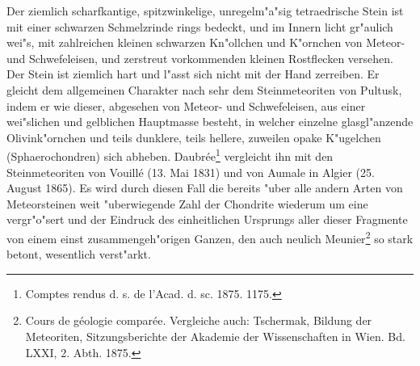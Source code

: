 \documentclass[a4paper, 11pt, oneside]{article}
\begin{document}
Der ziemlich scharfkantige, spitzwinkelige, unregelm"a"sig tetraedrische Stein ist mit einer schwarzen Schmelzrinde rings bedeckt, und im Innern licht gr"aulich wei"s, mit zahlreichen kleinen schwarzen Kn"ollchen und K"ornchen von Meteor- und Schwefeleisen, und zerstreut vorkommenden kleinen Rostflecken versehen. Der Stein ist ziemlich hart und l"asst sich nicht mit der Hand zerreiben. Er gleicht dem allgemeinen Charakter nach sehr dem Steinmeteoriten von Pultusk, indem er wie dieser, abgesehen von Meteor- und Schwefeleisen, aus einer wei"slichen und gelblichen Hauptmasse besteht, in welcher einzelne glasgl"anzende Olivink"ornchen und teils dunklere, teils hellere, zuweilen opake K"ugelchen (Sphaerochondren) sich abheben. Daubrée\footnote{Comptes rendus d. s. de l'Acad. d. sc. 1875. 1175.} vergleicht ihn mit den Steinmeteoriten von Vouillé (13. Mai 1831) und von Aumale in Algier (25. August 1865). Es wird durch diesen Fall die bereits "uber alle andern Arten von Meteorsteinen weit "uberwiegende Zahl der Chondrite wiederum um eine vergr"o"sert und der Eindruck des einheitlichen Ursprungs aller dieser Fragmente von einem einst zusammengeh"origen Ganzen, den auch neulich Meunier\footnote{Cours de géologie comparée. Vergleiche auch: Tschermak, Bildung der Meteoriten, Sitzungsberichte der Akademie der Wissenschaften in Wien. Bd. LXXI, 2. Abth. 1875.} so stark betont, wesentlich verst"arkt.
\end{document}

